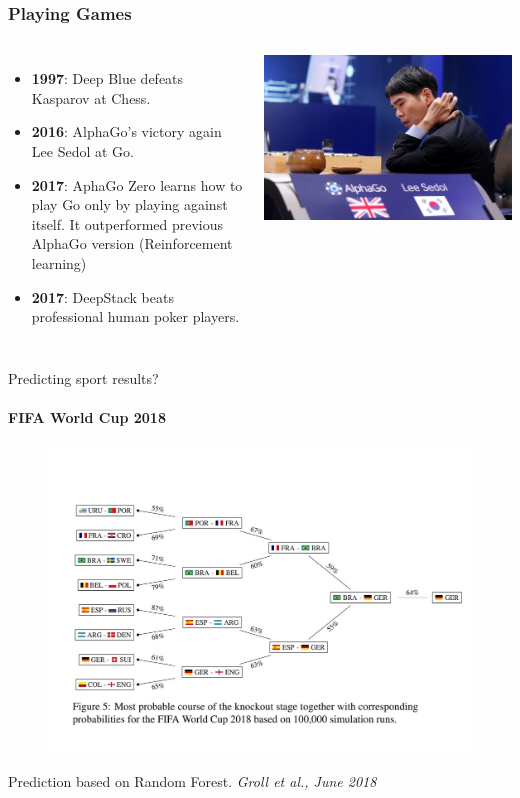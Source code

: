 \documentclass[handout]{beamer}
\newcommand{\rref}[1][]{\hfill{\scriptsize\textit{#1}}}
\begin{document}
\begin{frame}
\frametitle{Playing Games}
\begin{columns}
\begin{itemize}
\item {\bf 1997}: Deep Blue defeats Kasparov at Chess.
\item {\bf 2016}: AlphaGo's victory again Lee Sedol at Go.
\item {\bf 2017}: AphaGo Zero learns how to play Go only by playing against
  itself. It outperformed previous AlphaGo version (Reinforcement
  learning)
\item {\bf 2017}: DeepStack beats professional human poker players.
\end{itemize}
\includegraphics[width=\textwidth]{./fig/L1/alphago.jpg}
\end{columns}
\end{frame}

\begin{frame}{Predicting sport results?}
\framesubtitle{FIFA World Cup 2018}
   \begin{figure}
\includegraphics[trim={1cm 2cm 1cm 4cm},clip,width=\textwidth]{./fig/L1/fifa2018.jpg}
\end{figure}
Prediction based on Random Forest.
   \rref[Groll et al., June 2018]
\end{frame}
\end{document}
